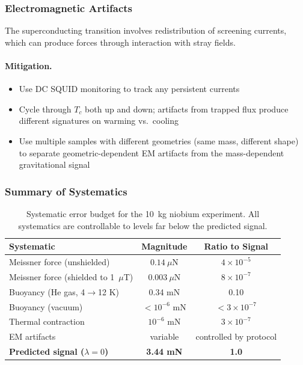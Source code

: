 \documentclass[12pt,a4paper]{article}
\theoremstyle{definition}
\theoremstyle{remark}
\begin{document}
\subsubsection{Electromagnetic Artifacts}

The superconducting transition involves redistribution of screening currents,
which can produce forces through interaction with stray fields.

\paragraph{Mitigation.}
\begin{itemize}
\item Use DC SQUID monitoring to track any persistent currents
\item Cycle through $T_c$ both up and down; artifacts from trapped flux
produce different signatures on warming vs.\ cooling
\item Use multiple samples with different geometries (same mass, different
shape) to separate geometric-dependent EM artifacts from the mass-dependent
gravitational signal
\end{itemize}

\subsubsection{Summary of Systematics}

\begin{table}[h]
\centering
\renewcommand{\arraystretch}{1.3}
\begin{tabular}{lcc}
\toprule
\textbf{Systematic} & \textbf{Magnitude} & \textbf{Ratio to Signal} \\
\midrule
Meissner force (unshielded) & $0.14~\mu$N & $4 \times 10^{-5}$ \\
Meissner force (shielded to 1~$\mu$T) & $0.003~\mu$N & $8 \times 10^{-7}$ \\
Buoyancy (He gas, 4$\to$12 K) & 0.34 mN & 0.10 \\
Buoyancy (vacuum) & $< 10^{-6}$ mN & $< 3 \times 10^{-7}$ \\
Thermal contraction & $10^{-6}$ mN & $3 \times 10^{-7}$ \\
EM artifacts & variable & controlled by protocol \\
\midrule
\textbf{Predicted signal ($\lambda = 0$)} & \textbf{3.44 mN} & \textbf{1.0} \\
\bottomrule
\end{tabular}
\caption{Systematic error budget for the 10~kg niobium experiment.  All
systematics are controllable to levels far below the predicted signal.}
\label{tab:systematics}
\end{table}
\end{document}
